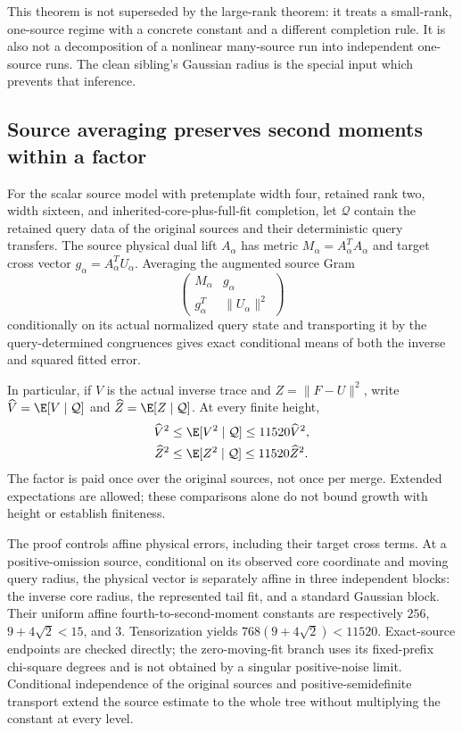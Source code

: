 \documentclass[11pt,oneside,openany,a4paper]{book}
\numberwithin{equation}{chapter}
\theoremstyle{definition}
\theoremstyle{remark}
\begin{document}
This theorem is not superseded by the large-rank theorem: it treats a
small-rank, one-source regime with a concrete constant and a different
completion rule.  It is also not a decomposition of a nonlinear
many-source run into independent one-source runs.  The clean sibling's
Gaussian radius is the special input which prevents that inference.

\subsection{Source averaging preserves second moments within a factor}

For the scalar source model with pretemplate width four, retained rank
two, width sixteen, and inherited-core-plus-full-fit completion, let
$\mathcal Q$ contain the retained query data of the original sources
and their deterministic query transfers.  The source physical dual
lift $A_\alpha$ has metric $M_\alpha=A_\alpha^TA_\alpha$ and target
cross vector $g_\alpha=A_\alpha^TU_\alpha$.  Averaging the augmented
source Gram
\[
 \begin{pmatrix}
 M_\alpha&g_\alpha\\g_\alpha^T&\lVert U_\alpha\rVert^2
 \end{pmatrix}
\]
conditionally on its actual normalized query state and transporting it
by the query-determined congruences gives exact conditional means of
both the inverse and squared fitted error.

In particular, if $V$ is the actual inverse trace and
$Z=\lVert F-U\rVert^2$, write
$\widehat V=\E[V\mid\mathcal Q]$ and
$\widehat Z=\E[Z\mid\mathcal Q]$.  At every finite height,
\begin{align}
 \widehat V^2&\leq\E[V^2\mid\mathcal Q]
                         \leq11520\widehat V^2,\\
 \widehat Z^2&\leq\E[Z^2\mid\mathcal Q]
                         \leq11520\widehat Z^2.
 \label{upd:eq:route-source-comparison}
\end{align}
The factor is paid once over the original sources, not once per merge.
Extended expectations are allowed; these comparisons alone do not
bound growth with height or establish finiteness.

The proof controls affine physical errors, including their target
cross terms.  At a positive-omission source, conditional on its observed
core coordinate and moving query radius, the physical vector is
separately affine in three independent blocks: the inverse core radius,
the represented tail fit, and a standard Gaussian block.  Their uniform
affine fourth-to-second-moment constants are respectively
$256$, $9+4\sqrt2<15$, and $3$.  Tensorization yields
$768(9+4\sqrt2)<11520$.  Exact-source endpoints are checked directly;
the zero-moving-fit branch uses its fixed-prefix chi-square degrees
and is not obtained by a singular positive-noise limit.  Conditional
independence of the original sources and positive-semidefinite
transport extend the source estimate to the whole tree without
multiplying the constant at every level.
\end{document}
